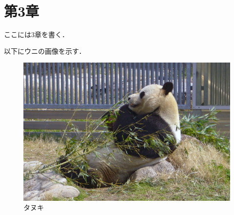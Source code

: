 \section{第3章}
\label{sec:3}

ここには3章を書く．

以下にウニの画像を示す．

\begin{figure}[b]
    \centering
    \includegraphics[width=0.8\linewidth]{figs/crab.jpg}
    \caption{タヌキ}
    \label{fig:dog}
\end{figure}

